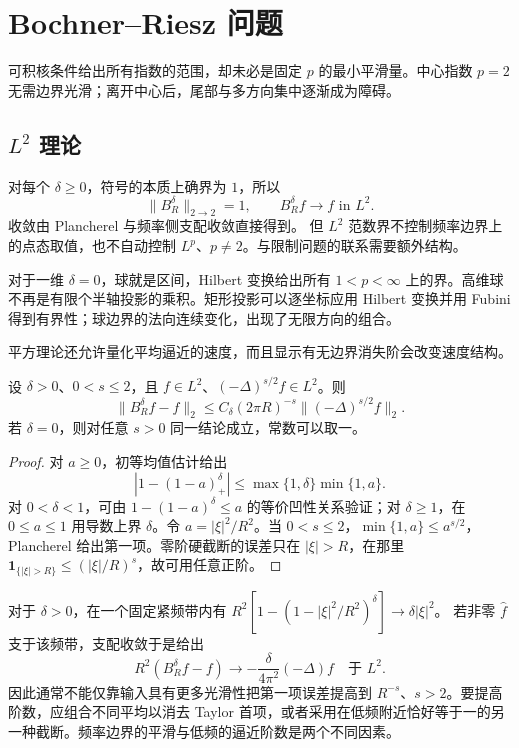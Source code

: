 \section{Bochner–Riesz 问题}
\label{b2:sec:2403}

可积核条件给出所有指数的范围，却未必是固定 \(p\) 的最小平滑量。中心指数 \(p=2\) 无需边界光滑；离开中心后，尾部与多方向集中逐渐成为障碍。

\subsection{\texorpdfstring{\(L^2\)}{L2} 理论}
\label{b2:subsec:240301}

对每个 \(\delta\ge0\)，符号的本质上确界为 \(1\)，所以
\[
 \|B_R^\delta\|_{2\to2}=1,\qquad B_R^\delta f\to f\text{ in }L^2.
\]
收敛由 Plancherel 与频率侧支配收敛直接得到。
但 \(L^2\) 范数界不控制频率边界上的点态取值，也不自动控制 \(L^p\)、\(p\ne2\)。与限制问题的联系需要额外结构。

\ProseParagraphBreak
对于一维 \(\delta=0\)，球就是区间，Hilbert 变换给出所有 \(1<p<\infty\) 上的界。高维球不再是有限个半轴投影的乘积。矩形投影可以逐坐标应用 Hilbert 变换并用 Fubini 得到有界性；球边界的法向连续变化，出现了无限方向的组合。

平方理论还允许量化平均逼近的速度，而且显示有无边界消失阶会改变速度结构。
\begin{proposition}\label{b2:prop:24-l2-rate}
设 \(\delta>0\)、\(0<s\leq2\)，且 \(f\in L^2\)、\((-\Delta)^{s/2}f\in L^2\)。则
\[
 \|B_R^\delta f-f\|_2
 \leq C_\delta(2\pi R)^{-s}\|(-\Delta)^{s/2}f\|_2.
\]
若 \(\delta=0\)，则对任意 \(s>0\) 同一结论成立，常数可以取一。
\end{proposition}
\begin{proof}
对 \(a\geq0\)，初等均值估计给出
\[
 |1-(1-a)_+^\delta|\leq\max\{1,\delta\}\min\{1,a\}.
\]
对 \(0<\delta<1\)，可由 \(1-(1-a)^\delta\leq a\) 的等价凹性关系验证；对 \(\delta\geq1\)，在 \(0\leq a\leq1\) 用导数上界 \(\delta\)。令 \(a=|\xi|^2/R^2\)。当 \(0<s\leq2\)，\(\min\{1,a\}\leq a^{s/2}\)，Plancherel 给出第一项。零阶硬截断的误差只在 \(|\xi|>R\)，在那里 \(\mathbf1_{\{|\xi|>R\}}\leq(|\xi|/R)^s\)，故可用任意正阶。
\end{proof}
对于 \(\delta>0\)，在一个固定紧频带内有
\(R^2[1-(1-|\xi|^2/R^2)^\delta]\to\delta|\xi|^2\)。
若非零 \(\widehat f\) 支于该频带，支配收敛于是给出
\[
 R^2(B_R^\delta f-f)\longrightarrow
 -\frac{\delta}{4\pi^2}(-\Delta)f
 \quad\text{于 }L^2.
\]
因此通常不能仅靠输入具有更多光滑性把第一项误差提高到 \(R^{-s}\)、\(s>2\)。要提高阶数，应组合不同平均以消去 Taylor 首项，或者采用在低频附近恰好等于一的另一种截断。频率边界的平滑与低频的逼近阶数是两个不同因素。


